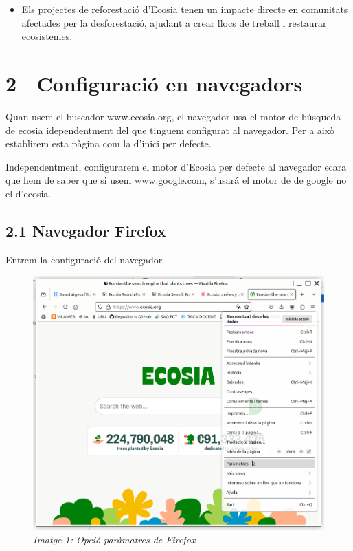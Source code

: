 \documentclass[
  a4paper,
]{article}
\providecommand{\tightlist}{%
  \setlength{\itemsep}{0pt}\setlength{\parskip}{0pt}}
\begin{document}
\begin{itemize}
\tightlist
\item
  Els projectes de reforestació d'Ecosia tenen un impacte directe en
  comunitats afectades per la desforestació, ajudant a crear llocs de
  treball i restaurar ecosistemes.
\end{itemize}

\newpage

\section{2 🔧 Configuració en
navegadors}\label{configuraciuxf3-en-navegadors}

Quan usem el buscador www.ecosia.org, el navegador usa el motor de
búsqueda de ecosia idependentment del que tinguem configurat al
navegador. Per a això establirem esta pàgina com la d'inici per defecte.

Independentment, configurarem el motor d'Ecosia per defecte al navegador
ecara que hem de saber que si usem www.google.com, s'usará el motor de
de google no el d'ecosia.

\subsection{2.1 Navegador Firefox}\label{navegador-firefox}

Entrem la configuració del navegador

\begin{figure}
\centering
\includegraphics{png/1-Firefox-Parametres.png}
\caption{\emph{Imatge 1: Opció paràmatres de Firefox}}
\end{figure}
\end{document}
